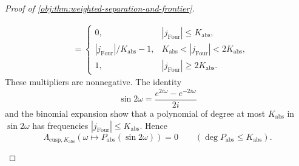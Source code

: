 \documentclass[11pt]{article}
\begin{document}
\begin{proof}[Proof of \cref{obj:thm:weighted-separation-and-frontier}]
\begin{enumerate}
\[\begin{aligned}
&=\begin{cases}
0,&|j_{\mathrm{Four}}|\le K_{\mathrm{abs}},\\
|j_{\mathrm{Four}}|/K_{\mathrm{abs}}-1,
&K_{\mathrm{abs}}<|j_{\mathrm{Four}}|<2K_{\mathrm{abs}},\\
1,&|j_{\mathrm{Four}}|\ge2K_{\mathrm{abs}}.
\end{cases}
\end{aligned}
\]
These multipliers are nonnegative. The identity
\[
\sin2\omega=\frac{e^{2i\omega}-e^{-2i\omega}}{2i}
\]
and the binomial expansion show that a polynomial of degree at most
\(K_{\mathrm{abs}}\) in \(\sin2\omega\) has frequencies
\(|j_{\mathrm{Four}}|\le K_{\mathrm{abs}}\). Hence
\[
\Lambda_{\mathrm{cusp},K_{\mathrm{abs}}}
 (\omega\mapsto P_{\mathrm{abs}}(\sin2\omega))=0
\qquad(\deg P_{\mathrm{abs}}\le K_{\mathrm{abs}}).
\]


\end{enumerate}
\end{proof}
\end{document}
